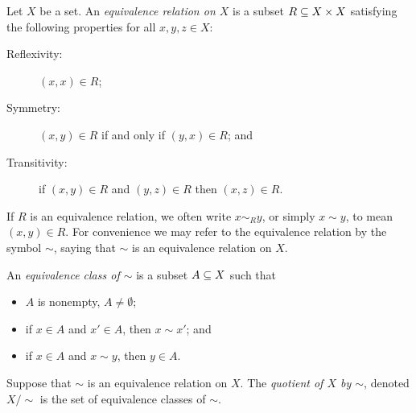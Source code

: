 \documentclass[CT4S-EN-RU]{subfiles}
\begin{document}
\begin{definitionENG}
Let $X$ be a set. An {\em equivalence relation on $X$} is a subset $R\ss X\times X$ satisfying the following properties for all $x,y,z\in X$:
\begin{description}
\item[Reflexivity:] $(x,x)\in R$;
\item[Symmetry:] $(x,y)\in R$ if and only if $(y,x)\in R$; and
\item[Transitivity:] if $(x,y)\in R$ and $(y,z)\in R$ then $(x,z)\in R$.
\end{description}
If $R$ is an equivalence relation, we often write $x\sim_R y$, or simply $x\sim y$, to mean $(x,y)\in R$. For convenience we may refer to the equivalence relation by the symbol $\sim$, saying that $\sim$ is an equivalence relation on $X$.

An {\em equivalence class of $\sim$} is a subset $A\ss X$ such that
\begin{itemize}
\item $A$ is nonempty, $A\neq\emptyset$;
\item if $x\in A$ and $x'\in A$, then $x\sim x'$; and 
\item if $x\in A$ and $x\sim y$, then $y\in A$.
\end{itemize}
Suppose that $\sim$ is an equivalence relation on $X$. The {\em quotient of $X$ by $\sim$}, denoted $X/\sim$ is the set of equivalence classes of $\sim$.
\end{definitionENG}
\end{document}
